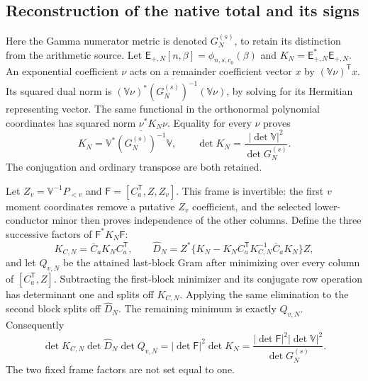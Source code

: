 \subsection{Reconstruction of the native total and its signs}
Here the Gamma numerator metric is denoted $G_N^{(s)}$, to retain
its distinction from the arithmetic source. Let
$\mathsf E_{+,N}[n,\beta]=\phi_{n,s,c_0}(\beta)$ and
$K_N=\mathsf E_{+,N}^*\mathsf E_{+,N}$.
An exponential coefficient $\nu$ acts on a remainder coefficient
vector $x$ by $(\mathbb V\nu)^{\mathsf T}x$.
Its squared dual norm is
$(\mathbb V\nu)^*\overline{(G_N^{(s)})^{-1}}(\mathbb V\nu)$,
by solving for its Hermitian representing vector.
The same functional in the orthonormal polynomial coordinates has
squared norm $\nu^*K_N\nu$. Equality for every $\nu$ proves
\begin{equation}\tag{NMR6}\label{nmr:dual}
K_N=\mathbb V^*\overline{(G_N^{(s)})^{-1}}\mathbb V,\qquad
\det K_N=\frac{|\det\mathbb V|^2}{\det G_N^{(s)}} .
\end{equation}
The conjugation and ordinary transpose are both retained.

Let $Z_v=\mathbb V^{-1}P_{<v}$ and
$\mathsf F=[C_a^{\mathsf T},Z,Z_v]$. This frame is invertible:
the first $v$ moment coordinates remove a putative $Z_v$ coefficient,
and the selected lower-conductor minor then proves independence of
the other columns. Define the three successive factors of
$\mathsf F^*K_N\mathsf F$:
\[
K_{C,N}=\overline C_aK_NC_a^{\mathsf T},\qquad
\widehat D_N=Z^*\{K_N-K_NC_a^{\mathsf T}K_{C,N}^{-1}
                                      \overline C_aK_N\}Z,
\]
and let $Q_{v,N}$ be the attained last-block Gram after minimizing
over every column of $[C_a^{\mathsf T},Z]$.
Subtracting the first-block minimizer and its conjugate row
operation has determinant one and splits off $K_{C,N}$.
Applying the same elimination to the second block splits off
$\widehat D_N$. The remaining minimum is exactly $Q_{v,N}$.
Consequently
\begin{equation}\tag{NMR7}\label{nmr:factorization}
\det K_{C,N}\det\widehat D_N\det Q_{v,N}
=|\det\mathsf F|^2\det K_N
=\frac{|\det\mathsf F|^2|\det\mathbb V|^2}{\det G_N^{(s)}} .
\end{equation}
The two fixed frame factors are not set equal to one.

